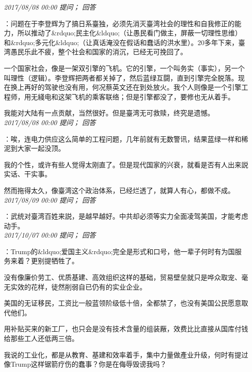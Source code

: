 \documentclass[twocolumn]{ctexart}
\begin{document}
\textit{\hfill\noindent\small 2017/08/08 00:00 提问； 回答}

：问题在于李登辉为了搞日系臺独，必须先消灭臺湾社会的理性和自我修正的能力，所以推动了\&rdquo;民主化\&ldquo;（让愚民看门做主，屏蔽一切理性思维）和\&rdquo;多元化\&ldquo;（让真话淹没在假话和蠢话的洪水里）。20多年下来，臺湾愚民乐此不疲，整个社会和国家的消沉，已经无可挽回了。

一个国家社会，像是一架双引擎的飞机。它的引擎，一个叫务实（事实），另一个叫理性（逻辑）。李登辉把两者都关掉了，然后蓝绿互闘，直到引擎完全脱落。现在换上再好的驾驶也没有用，何况蔡英文还在到处放火。我个人则像是一个引擎工程师，用无綫电和这架飞机的乘客联络；但是引擎都没了，要修也无从着手。

我能对大陆有一点贡献，当然很好。但是臺湾无可救赎，终究是遗憾。\\

\textit{\hfill\noindent\small 2017/08/08 00:00 提问； 回答}

：唉，连电力供应这么简单的工程问题，几年前就有无数警讯，结果蓝绿一样和稀泥到大家一起没顶。

我的个性，或许有些人觉得太刚直了。但是现代国家的兴衰，就看是否有人出来説实话、干实事。

然而拖得太久，像臺湾这个政治体系，已经烂透了，就算人有心，都做不成。\\

\textit{\hfill\noindent\small 2017/08/09 00:00 提问； 回答}

：武统对臺湾百姓来説，是越早越好。中共却必须等实力全面凌驾美国，才能考虑动手。\\

\textit{\hfill\noindent\small 2017/10/07 00:00 提问； 回答}

：Trump的\&ldquo;爱国主义\&rdquo;完全是形式和口号，他一辈子何时有为国服务来着？更别提牺牲了。

没有像廉价劳工、优质基建、高效组织这样的基础，贸易壁垒就只是哗众取宠、毫无实效的花样，徒然削弱自已仍有的实业企业。

美国的无证移民，工资比一般蓝领阶级低十倍，全都禁了，也没有美国公民愿意取代他们。

用补贴买来的新工厂，也只会是没有技术含量的组装厰，效费比比直接从国库付钱给那些工人还低两三倍。

我说的工业化，都是从教育、基建和效率着手，集中力量做產业升级，何时有提过像Trump这样锯箭疗伤的蠢事？你是在侮辱毁谤我吗？\\
\end{document}
